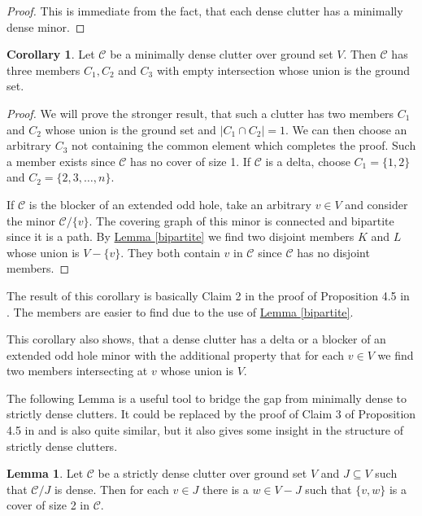 \documentclass[a4paper, 12pt]{scrbook}
\theoremstyle{definition}
\newtheorem{corollary}[theorem]{Corollary}
\newtheorem{lemma}[theorem]{Lemma}
\begin{document}
   \begin{proof}
       This is immediate from the fact, that each dense clutter has a minimally dense minor.
   \end{proof}

   \begin{corollary}\label{threemember}
       Let $\mathcal{C}$ be a minimally dense clutter over ground set $V$.
       Then $\mathcal{C}$ has three members $C_1, C_2$ and $C_3$ with empty intersection whose union is the ground set.
   \end{corollary}

   \begin{proof}
       We will prove the stronger result, that such a clutter has two members $C_1$ and $C_2$ whose union is the ground set and $|C_1 \cap C_2|=1$.
       We can then choose an arbitrary $C_3$ not containing the common element which completes the proof.
       Such a member exists since $\mathcal{C}$ has no cover of size 1.
       If $\mathcal{C}$ is a delta, choose $C_1=\{1,2\}$ and $C_2=\{2,3,\ldots,n\}$.

       If $\mathcal{C}$ is the blocker of an extended odd hole, take an arbitrary $v \in V$ and consider the minor $\mathcal{C} / \{v\}$.
       The covering graph of this minor is connected and bipartite since it is a path.
       By \hyperref[bipartite]{Lemma \ref*{bipartite}} we find two disjoint members $K$ and $L$ whose union is $V-\{v\}$.
       They both contain $v$ in $\mathcal{C}$ since $\mathcal{C}$ has no disjoint members.
   \end{proof}

   The result of this corollary is basically Claim 2 in the proof of Proposition 4.5 in \cite{restrictions}. The members are easier to find due to the use of \hyperref[bipartite]{Lemma \ref*{bipartite}}.

   This corollary also shows, that a dense clutter has a delta or a blocker of an extended odd hole minor with the additional property that for each $v \in V$ we find two members intersecting at $v$ whose union is $V$.

   The following Lemma is a useful tool to bridge the gap from minimally dense to strictly dense clutters. It could be replaced by the proof of Claim 3 of Proposition 4.5 in \cite{restrictions} and is also quite similar, but it also gives some insight in the structure of strictly dense clutters.
   \begin{lemma}\label{covers}
       Let $\mathcal{C}$ be a strictly dense clutter over ground set $V$ and $J \subseteq V$ such that $\mathcal{C} / J$ is dense.
       Then for each $v \in J$ there is a $w \in V-J$ such that $\{v,w\}$ is a cover of size 2 in $\mathcal{C}$.
   \end{lemma}
\end{document}
